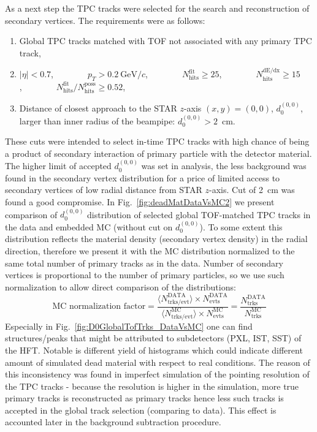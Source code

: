 As a next step the TPC tracks were selected for the search and reconstruction of secondary vertices. The requirements were as follows:\vspace{-5pt}
\begin{enumerate}
  \item Global TPC tracks matched with TOF not associated with any primary TPC track,\vspace{-8pt}
  \item $|\eta|<0.7$,~~~~~~~~$p_{T}>0.2~\text{GeV}/c$,~~~~~~~~$N_{\textrm{hits}}^{\textrm{fit}}\geq25$,~~~~~~~~$N_{\textrm{hits}}^{\textrm{dE/dx}}\geq15$,~~~~~~~~$N_{\textrm{hits}}^{\textrm{fit}}/N_{\textrm{hits}}^{\textrm{poss}}\geq0.52$,\vspace{-8pt}
  \item Distance of closest approach to the STAR $z$-axis $(x, y)=(0, 0)$, $d_{0}^{(0,0)}$, larger than inner radius of the beampipe: $d_{0}^{(0,0)}>2$~cm.
\end{enumerate}%
These cuts were intended to select in-time TPC tracks with high chance of being a product of secondary interaction of primary particle with the detector material. The higher limit of accepted $d_{0}^{(0,0)}$ was set in analysis, the less background was found in the secondary vertex distribution for a price of limited access to secondary vertices of low radial distance from STAR $z$-axis. Cut of 2~cm was found a good compromise. In Fig.~\ref{fig:deadMatDataVsMC2} we present comparison of $d_{0}^{(0,0)}$ distribution of selected global TOF-matched TPC tracks in the data and embedded MC (without cut on $d_{0}^{(0,0)}$). To some extent this distribution reflects the material density (secondary vertex density) in the radial direction, therefore we present it with the MC distribution normalized to the same total number of primary tracks as in the data. Number of secondary vertices is proportional to the number of primary particles, so we use such normalization to allow direct comparison of the distributions:
\begin{equation}\label{eq:mcNormDeadMat}
\text{MC normalization factor}=\frac{\langle N_{\text{trks/evt}}^{\text{DATA}}\rangle \times N_{\text{evts}}^{\text{DATA}}}{ \langle N_{\text{trks/evt}}^{\text{MC}}\rangle \times N_{\text{evts}}^{\text{MC}} } = \frac{N_{\text{trks}}^{\text{DATA}}}{N_{\text{trks}}^{\text{MC}}}
\end{equation}%
Especially in Fig.~\ref{fig:D0GlobalTofTrks_DataVsMC} one can find structures/peaks that might be attributed to subdetectors (PXL, IST, SST) of the HFT. Notable is different yield of histograms which could indicate different amount of simulated dead material with respect to real conditions. The reason of this inconsistency was found in imperfect simulation of the pointing resolution of the TPC tracks - because the resolution is higher in the simulation, more true primary tracks is reconstructed as primary tracks hence less such tracks is accepted in the global track selection (comparing to data). This effect is accounted later in the background subtraction procedure.

